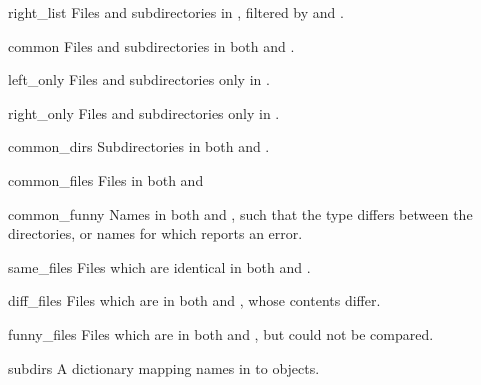 \begin{memberdesc}[dircmp]{right_list}
Files and subdirectories in , filtered by  and
.
\end{memberdesc}

\begin{memberdesc}[dircmp]{common}
Files and subdirectories in both  and .
\end{memberdesc}

\begin{memberdesc}[dircmp]{left_only}
Files and subdirectories only in .
\end{memberdesc}

\begin{memberdesc}[dircmp]{right_only}
Files and subdirectories only in .
\end{memberdesc}

\begin{memberdesc}[dircmp]{common_dirs}
Subdirectories in both  and .
\end{memberdesc}

\begin{memberdesc}[dircmp]{common_files}
Files in both  and 
\end{memberdesc}

\begin{memberdesc}[dircmp]{common_funny}
Names in both  and , such that the type differs between
the directories, or names for which  reports an
error.
\end{memberdesc}

\begin{memberdesc}[dircmp]{same_files}
Files which are identical in both  and .
\end{memberdesc}

\begin{memberdesc}[dircmp]{diff_files}
Files which are in both  and , whose contents differ.
\end{memberdesc}

\begin{memberdesc}[dircmp]{funny_files}
Files which are in both  and , but could not be
compared.
\end{memberdesc}

\begin{memberdesc}[dircmp]{subdirs}
A dictionary mapping names in  to
 objects.
\end{memberdesc}
